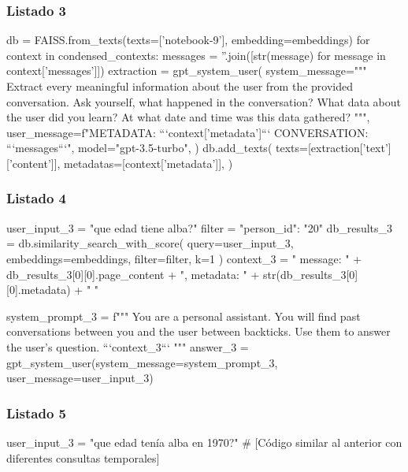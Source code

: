 \subsubsection{Listado 3}
\label{anexo:code-4-1-9-3}

\begin{APACode}
db = FAISS.from_texts(texts=['notebook-9'], embedding=embeddings)
for context in condensed_contexts:
    messages = ''.join([str(message) for message in context['messages']])
    extraction = gpt_system_user(
        system_message="""
        Extract every meaningful information about the user from the provided 
        conversation. Ask yourself, what happened in the conversation?
        What data about the user did you learn?
        At what date and time was this data gathered?
        """,
        user_message=f"METADATA: ```{context['metadata']}``` 
                      CONVERSATION: ```{messages}```",
        model="gpt-3.5-turbo",
    )
    db.add_texts(
        texts=[extraction['text']['content']],
        metadatas=[context['metadata']],
    )
\end{APACode}

\subsubsection{Listado 4}
\label{anexo:code-4-1-9-4}

\begin{APACode}
user_input_3 = "que edad tiene alba?"
filter = {"person_id": "20"}
db_results_3 = db.similarity_search_with_score(
    query=user_input_3, embeddings=embeddings, filter=filter, k=1
)
context_3 = "{ message: " + db_results_3[0][0].page_content + 
            ", metadata: " + str(db_results_3[0][0].metadata) + " }"

system_prompt_3 = f"""
You are a personal assistant. You will find past conversations between you and 
the user between backticks. Use them to answer the user's question.
```{context_3}```
"""
answer_3 = gpt_system_user(system_message=system_prompt_3, user_message=user_input_3)
\end{APACode}

\subsubsection{Listado 5}
\label{anexo:code-4-1-9-5}

\begin{APACode}
user_input_3 = "que edad tenía alba en 1970?"
# [Código similar al anterior con diferentes consultas temporales]
\end{APACode}


